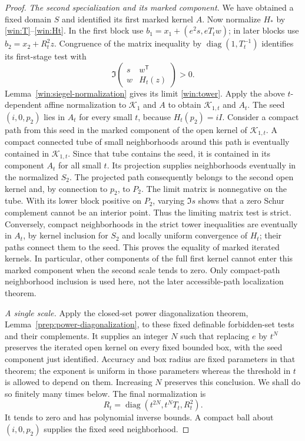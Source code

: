\begin{proof}
\emph{The second specialization and its marked component.}
We have obtained a fixed domain $S$ and identified its first marked
kernel $A$.  Now normalize $H_*$ by \eqref{win:T}--\eqref{win:Ht}.
In the first block use $b_1=x_1+(e^2s,eT_tw)$; in later blocks use
$b_2=x_2+R_t^2z$.  Congruence of the matrix inequality by
$\operatorname{diag}(1,T_t^{-1})$ identifies its first-stage test
with
\[
              \Im\begin{pmatrix}s&w^{\mathsf T}\\w&H_t(z)\end{pmatrix}>0.
\]
Lemma~\ref{win:siegel-normalization} gives its limit
\eqref{win:tower}.  Apply the above $t$-dependent affine normalization
to $\mathcal K_1$ and $A$ to obtain $\mathcal K_{1,t}$ and $A_t$.
The seed $(i,0,p_2)$ lies in $A_t$ for every small $t$, because
$H_t(p_2)=iI$.  Consider a compact path from this seed in the
marked component of the open kernel of $\mathcal K_{1,t}$.
A compact connected tube of small neighborhoods around this path
is eventually contained in $\mathcal K_{1,t}$.  Since that tube
contains the seed, it is contained in its component $A_t$ for all
small $t$.  Its projection supplies neighborhoods eventually in
the normalized $S_2$.  The projected path consequently belongs
to the second open kernel and, by connection to $p_2$, to $P_2$.
The limit matrix is nonnegative on the tube.  With its lower block
positive on $P_2$, varying $\Im s$ shows that a zero Schur
complement cannot be an interior point.  Thus the limiting matrix
test is strict.  Conversely, compact neighborhoods in the strict
tower inequalities are eventually in $A_t$, by kernel inclusion
for $S_2$ and locally uniform convergence of $H_t$; their paths
connect them to the seed.  This proves the equality of marked
iterated kernels.  In particular, other components of the full
first kernel cannot enter this marked component when the second
scale tends to zero.  Only compact-path neighborhood inclusion
is used here, not the later accessible-path localization theorem.

\emph{A single scale.}
Apply the closed-set power diagonalization theorem,
Lemma~\ref{prep:power-diagonalization}, to these fixed definable
forbidden-set tests and their complements.  It supplies an integer
$N$ such that replacing $e$ by $t^N$ preserves the iterated open
kernel on every fixed bounded box, with the seed component just
identified.  Accuracy and box radius are fixed parameters in that
theorem; the exponent is uniform in those parameters whereas the
threshold in $t$ is allowed to depend on them.  Increasing $N$
preserves this conclusion.  We shall do so finitely many times
below.  The final normalization is
\begin{equation}\label{win:Rt}
          R_t=\operatorname{diag}
                     (t^{2N},t^NT_t,R_t^2).
\end{equation}
It tends to zero and has polynomial inverse bounds.  A compact
ball about $(i,0,p_2)$ supplies the fixed seed neighborhood.


\end{proof}
